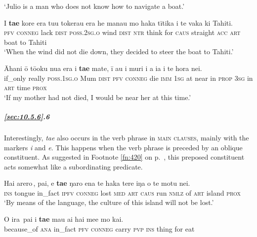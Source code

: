 \glt 
‘Julio is a man who does not know how to navigate a boat.’ \textstyleExampleref{[R303.151]} 
\z

\ea\label{ex:10.153}
\gll I \textbf{ta{\ꞌ}e} kore era tu{\ꞌ}u tokerau era he mana{\ꞌ}u mo haka tītika  i te vaka ki Tahiti.\\
\textsc{pfv} \textsc{conneg} lack \textsc{dist} \textsc{poss.2sg.o} wind \textsc{dist} \textsc{ntr} think for \textsc{caus} straight  \textsc{acc} \textsc{art} boat to Tahiti\\

\glt 
‘When the wind did not die down, they decided to steer the boat to Tahiti.’ \textstyleExampleref{[R303.064]} 
\z

\ea\label{ex:10.154}
\gll {\ꞌ}Āhani {\ꞌ}ō tō{\ꞌ}oku nua era i \textbf{ta{\ꞌ}e} mate, {\ꞌ}ī au  {\ꞌ}i muri i a ia {\ꞌ}i te hora nei.\\
if\_only really \textsc{poss.1sg.o} Mum \textsc{dist} \textsc{pfv} \textsc{conneg} die \textsc{imm} \textsc{1sg}  at near in \textsc{prop} \textsc{3sg} in \textsc{art} time \textsc{prox}\\

\glt 
‘If my mother had not died, I would be near her at this time.’ \textstyleExampleref{[R245.007]} 
\z

\subparagraph{\ref{sec:10.5.6}.6} Interestingly, \textit{ta{\ꞌ}e} also occurs in the verb phrase in \textsc{main clauses}, mainly with the  markers \textit{i} and \textit{e}. This happens when the verb phrase is preceded by an oblique constituent. As suggested in Footnote \ref{fn:420} on p.~\pageref{fn:420}, this preposed constituent acts somewhat like a subordinating predicate.

\ea\label{ex:10.155}
\gll {\ob}Hai {\ꞌ}arero\,{\cb}, pa{\ꞌ}i, e \textbf{ta{\ꞌ}e} ŋaro ena te haka tere iŋa  o te motu nei.\\
{\db}\textsc{ins} tongue in\_fact \textsc{ipfv} \textsc{conneg} lost \textsc{med} \textsc{art} \textsc{caus} run \textsc{nmlz}  of \textsc{art} island \textsc{prox}\\

\glt 
‘By means of the language, the culture of this island will not be lost.’ \textstyleExampleref{[R647.155]} 
\z

\ea\label{ex:10.156}
\gll {\ob}{\ꞌ}O ira\,{\cb} pa{\ꞌ}i i \textbf{ta{\ꞌ}e} ma{\ꞌ}u ai hai me{\ꞌ}e mo kai. \\
{\db}because\_of \textsc{ana} in\_fact \textsc{pfv} \textsc{conneg} carry \textsc{pvp} \textsc{ins} thing for eat \\

